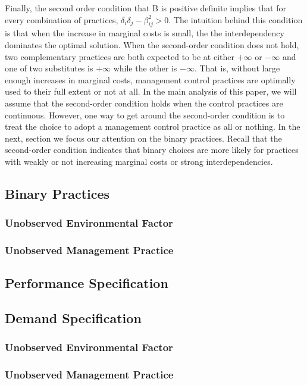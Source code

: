 \documentclass[12pt]{article}
\begin{document}
Finally, the second order condition that B is positive definite implies that for every combination of practices, $\delta_i \delta_j - \beta_{ij}^2 > 0$. The intuition behind this condition is that when the increase in marginal costs is small, the the interdependency dominates the optimal solution. When the second-order condition does not hold, two complementary practices are both expected to be at either \(+\infty\) or \(-\infty\) and one of two substitutes is \(+\infty\) while the other is \(-\infty\). That is, without large enough increases in marginal costs, management control practices are optimally used to their full extent or not at all. In the main analysis of this paper, we will assume that the second-order condition holds when the control practices are continuous. However, one way to get around the second-order condition is to treat the choice to adopt a management control practice as all or nothing. In the next, section we focus our attention on the binary practices. Recall that the second-order condition indicates that binary choices are more likely for practices with weakly or not increasing marginal costs or strong interdependencies.

\subsection{Binary Practices}



\subsubsection{Unobserved Environmental Factor}
\subsubsection{Unobserved Management Practice}

\subsection{Performance Specification}
\subsection{Demand Specification}
\subsubsection{Unobserved Environmental Factor}
\subsubsection{Unobserved Management Practice}
\end{document}
